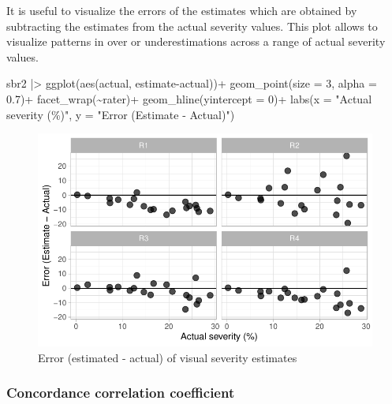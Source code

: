 \documentclass[
  letterpaper,
  DIV=11,
  numbers=noendperiod]{scrreprt}
\newenvironment{Shaded}{\begin{snugshade}}{\end{snugshade}}
\newcommand{\AttributeTok}[1]{\textcolor[rgb]{0.40,0.45,0.13}{#1}}
\newcommand{\DecValTok}[1]{\textcolor[rgb]{0.68,0.00,0.00}{#1}}
\newcommand{\FloatTok}[1]{\textcolor[rgb]{0.68,0.00,0.00}{#1}}
\newcommand{\FunctionTok}[1]{\textcolor[rgb]{0.28,0.35,0.67}{#1}}
\newcommand{\NormalTok}[1]{\textcolor[rgb]{0.00,0.23,0.31}{#1}}
\newcommand{\SpecialCharTok}[1]{\textcolor[rgb]{0.37,0.37,0.37}{#1}}
\newcommand{\StringTok}[1]{\textcolor[rgb]{0.13,0.47,0.30}{#1}}
\begin{document}
It is useful to visualize the errors of the estimates which are obtained
by subtracting the estimates from the actual severity values. This plot
allows to visualize patterns in over or underestimations across a range
of actual severity values.

\begin{Shaded}
\begin{Highlighting}[]
\NormalTok{sbr2 }\SpecialCharTok{|\textgreater{}} 
  \FunctionTok{ggplot}\NormalTok{(}\FunctionTok{aes}\NormalTok{(actual, estimate}\SpecialCharTok{{-}}\NormalTok{actual))}\SpecialCharTok{+}
  \FunctionTok{geom\_point}\NormalTok{(}\AttributeTok{size =} \DecValTok{3}\NormalTok{, }\AttributeTok{alpha =} \FloatTok{0.7}\NormalTok{)}\SpecialCharTok{+}
  \FunctionTok{facet\_wrap}\NormalTok{(}\SpecialCharTok{\textasciitilde{}}\NormalTok{rater)}\SpecialCharTok{+}
  \FunctionTok{geom\_hline}\NormalTok{(}\AttributeTok{yintercept =} \DecValTok{0}\NormalTok{)}\SpecialCharTok{+}
  \FunctionTok{labs}\NormalTok{(}\AttributeTok{x =} \StringTok{"Actual severity (\%)"}\NormalTok{,}
       \AttributeTok{y =} \StringTok{"Error (Estimate {-} Actual)"}\NormalTok{)}
\end{Highlighting}
\end{Shaded}

\begin{figure}[H]

{\centering \includegraphics{./data-accuracy_files/figure-pdf/fig-errors-1.pdf}

}

\caption{\label{fig-errors}Error (estimated - actual) of visual severity
estimates}

\end{figure}

\hypertarget{concordance-correlation-coefficient}{%
\subsubsection{Concordance correlation
coefficient}\label{concordance-correlation-coefficient}}
\end{document}
